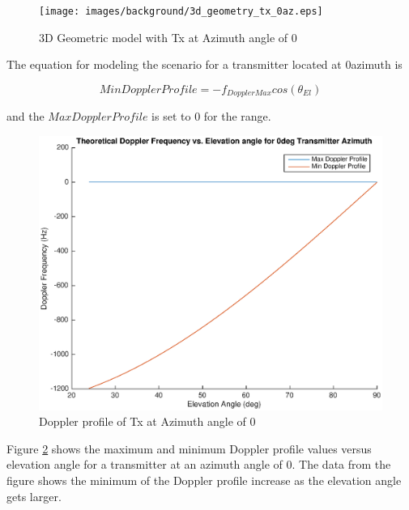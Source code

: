\begin{figure}
	\begin{center}
		\texttt{[image: images/background/3d\_geometry\_tx\_0az.eps]}
		\caption{3D Geometric model with Tx at Azimuth angle of 0\textdegree}
		\label{fig:3D_model_0az}
	\end{center}
\end{figure}

The equation for modeling the scenario for a transmitter located at 0\textdegree \space azimuth is

\begin{equation}
	MinDopplerProfile = -f_{DopplerMax}cos(\theta_{El})
	\label{eq:theory_0_lower}
\end{equation}

and the $MaxDopplerProfile$ is set to 0 for the range.

\begin{figure}
	\begin{center}
		\includegraphics[width=15cm]{images/background/3d_geometry_tx_0az_doppler_profile.eps}
		\caption{Doppler profile of Tx at Azimuth angle of 0\textdegree}
		\label{fig:3D_model_0az_doppler}
	\end{center}
\end{figure}

Figure \ref{fig:3D_model_0az_doppler} shows the maximum and minimum Doppler profile values versus elevation angle for a transmitter at an azimuth angle of 0\textdegree. The data from the figure shows the minimum of the Doppler profile increase as the elevation angle gets larger.
